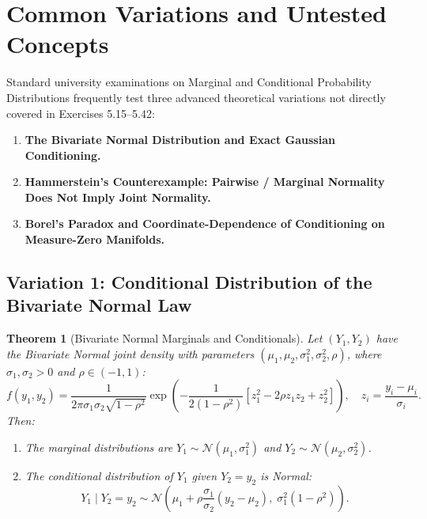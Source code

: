 \documentclass[11pt, letterpaper]{article}
\newtheorem{theorem}{Theorem}[section]
\theoremstyle{definition}
\theoremstyle{remark}
\begin{document}
\section{Common Variations and Untested Concepts}

Standard university examinations on Marginal and Conditional Probability Distributions frequently test three advanced theoretical variations not directly covered in Exercises 5.15--5.42:
\begin{enumerate}
    \item \textbf{The Bivariate Normal Distribution and Exact Gaussian Conditioning.}
    \item \textbf{Hammerstein's Counterexample: Pairwise / Marginal Normality Does Not Imply Joint Normality.}
    \item \textbf{Borel's Paradox and Coordinate-Dependence of Conditioning on Measure-Zero Manifolds.}
\end{enumerate}

\subsection{Variation 1: Conditional Distribution of the Bivariate Normal Law}

\begin{theorem}[Bivariate Normal Marginals and Conditionals]
Let $(Y_1, Y_2)$ have the Bivariate Normal joint density with parameters $(\mu_1, \mu_2, \sigma_1^2, \sigma_2^2, \rho)$, where $\sigma_1, \sigma_2 > 0$ and $\rho \in (-1, 1)$:
\[ f(y_1, y_2) = \frac{1}{2\pi \sigma_1 \sigma_2 \sqrt{1 - \rho^2}} \exp\left( -\frac{1}{2(1 - \rho^2)} \left[ z_1^2 - 2\rho z_1 z_2 + z_2^2 \right] \right), \quad z_i = \frac{y_i - \mu_i}{\sigma_i}. \]
Then:
\begin{enumerate}[label=(\alph*)]
    \item The marginal distributions are $Y_1 \sim \mathcal{N}(\mu_1, \sigma_1^2)$ and $Y_2 \sim \mathcal{N}(\mu_2, \sigma_2^2)$.
    \item The conditional distribution of $Y_1$ given $Y_2 = y_2$ is Normal:
    \[ Y_1 \mid Y_2 = y_2 \sim \mathcal{N}\left( \mu_1 + \rho \frac{\sigma_1}{\sigma_2}(y_2 - \mu_2), \; \sigma_1^2(1 - \rho^2) \right). \]
\end{enumerate}
\end{theorem}
\end{document}
